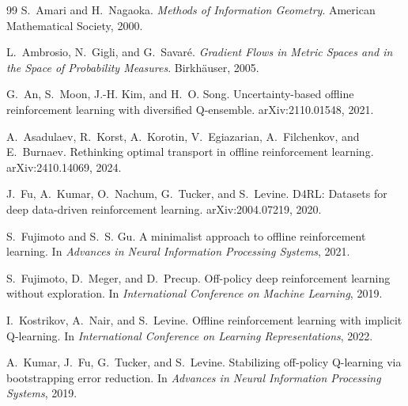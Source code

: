 \begin{thebibliography}{99}
S.~Amari and H.~Nagaoka.
\newblock \emph{Methods of Information Geometry}.
\newblock American Mathematical Society, 2000.

L.~Ambrosio, N.~Gigli, and G.~Savar\'e.
\newblock \emph{Gradient Flows in Metric Spaces and in the Space of Probability Measures}.
\newblock Birkh\"auser, 2005.

G.~An, S.~Moon, J.-H. Kim, and H.~O. Song.
\newblock Uncertainty-based offline reinforcement learning with diversified Q-ensemble.
\newblock arXiv:2110.01548, 2021.

A.~Asadulaev, R.~Korst, A.~Korotin, V.~Egiazarian, A.~Filchenkov, and E.~Burnaev.
\newblock Rethinking optimal transport in offline reinforcement learning.
\newblock arXiv:2410.14069, 2024.

J.~Fu, A.~Kumar, O.~Nachum, G.~Tucker, and S.~Levine.
\newblock D4RL: Datasets for deep data-driven reinforcement learning.
\newblock arXiv:2004.07219, 2020.

S.~Fujimoto and S.~S. Gu.
\newblock A minimalist approach to offline reinforcement learning.
\newblock In \emph{Advances in Neural Information Processing Systems}, 2021.

S.~Fujimoto, D.~Meger, and D.~Precup.
\newblock Off-policy deep reinforcement learning without exploration.
\newblock In \emph{International Conference on Machine Learning}, 2019.

I.~Kostrikov, A.~Nair, and S.~Levine.
\newblock Offline reinforcement learning with implicit Q-learning.
\newblock In \emph{International Conference on Learning Representations}, 2022.

A.~Kumar, J.~Fu, G.~Tucker, and S.~Levine.
\newblock Stabilizing off-policy Q-learning via bootstrapping error reduction.
\newblock In \emph{Advances in Neural Information Processing Systems}, 2019.


\end{thebibliography}

